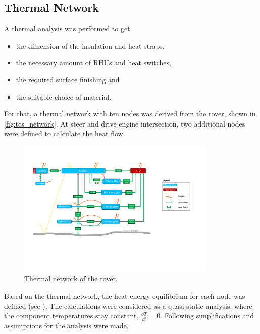 \subsection{Thermal Network}
A thermal analysis was performed to get
\begin{itemize}
	\item the dimension of the insulation and heat straps,
	\item the necessary amount of RHUs and heat switches,
	\item the required surface finishing and
	\item the suitable choice of material.\\
\end{itemize}

For that, a thermal network with ten nodes was derived from the rover, shown in \autoref{fig:tcs_network}.
At steer and drive engine intersection, two additional nodes were defined to calculate the heat flow.
\begin{figure}[h]
	\centering
	\includegraphics[width=0.85\textwidth]{Media/tcs_network}
	\caption{Thermal network of the rover.}
	\label{fig:tcs_network}
\end{figure}
Based on the thermal network, the heat energy equilibrium for each node was defined (see ).
The calculations were considered as a quasi-static analysis, where the component temperatures stay constant, $\frac{\dd T}{\dd t}=0$.
Following simplifications and assumptions for the analysis were made.
